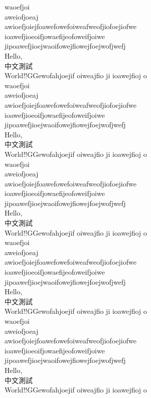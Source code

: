 \documentclass[12pt]{article}
\begin{document}
waoefjoi\\
aweiofjoeaj\\
awioefjoiejfoawefowefoiweafweofjiofoejiofwe\\
ioawefjioeoifjowaefijeofoweifjoiwe\\
jipoawefjioejwaoifowejfiowejfoejwofjwefj\\Hello, \\中文測試\\World!!GGewofahjoejif oiweajfio ji ioawejfioj o\\
waoefjoi\\
aweiofjoeaj\\
awioefjoiejfoawefowefoiweafweofjiofoejiofwe\\
ioawefjioeoifjowaefijeofoweifjoiwe\\
jipoawefjioejwaoifowejfiowejfoejwofjwefj\\Hello, \\中文測試\\World!!GGewofahjoejif oiweajfio ji ioawejfioj o\\
waoefjoi\\
aweiofjoeaj\\
awioefjoiejfoawefowefoiweafweofjiofoejiofwe\\
ioawefjioeoifjowaefijeofoweifjoiwe\\
jipoawefjioejwaoifowejfiowejfoejwofjwefj\\Hello, \\中文測試\\World!!GGewofahjoejif oiweajfio ji ioawejfioj o\\
waoefjoi\\
aweiofjoeaj\\
awioefjoiejfoawefowefoiweafweofjiofoejiofwe\\
ioawefjioeoifjowaefijeofoweifjoiwe\\
jipoawefjioejwaoifowejfiowejfoejwofjwefj\\Hello, \\中文測試\\World!!GGewofahjoejif oiweajfio ji ioawejfioj o\\
waoefjoi\\
aweiofjoeaj\\
awioefjoiejfoawefowefoiweafweofjiofoejiofwe\\
ioawefjioeoifjowaefijeofoweifjoiwe\\
jipoawefjioejwaoifowejfiowejfoejwofjwefj\\Hello, \\中文測試\\World!!GGewofahjoejif oiweajfio ji ioawejfioj o\\
\end{document}
